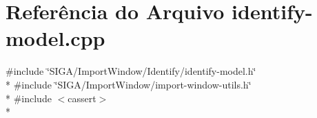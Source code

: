 \section{Referência do Arquivo identify-\/model.cpp}
\label{identify-model_8cpp}
{\ttfamily \#include \char`\"{}S\+I\+G\+A/\+Import\+Window/\+Identify/identify-\/model.\+h\char`\"{}}\\*
{\ttfamily \#include \char`\"{}S\+I\+G\+A/\+Import\+Window/import-\/window-\/utils.\+h\char`\"{}}\\*
{\ttfamily \#include $<$cassert$>$}\\*
